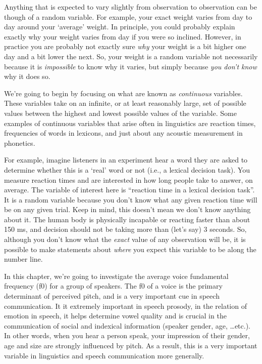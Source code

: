 \documentclass[
]{book}
\begin{document}
Anything that is expected to vary slightly from observation to observation can be though of a random variable. For example, your exact weight varies from day to day around your `average' weight. In principle, you could probably explain exactly why your weight varies from day if you were so inclined. However, in practice you are probably not exactly sure \emph{why} your weight is a bit higher one day and a bit lower the next. So, your weight is a random variable not necessarily because it is \emph{impossible} to know why it varies, but simply because \emph{you don't know} why it does so.

We're going to begin by focusing on what are known as \emph{continuous} variables. These variables take on an infinite, or at least reasonably large, set of possible values between the highest and lowest possible values of the variable. Some examples of continuous variables that arise often in linguistics are reaction times, frequencies of words in lexicons, and just about any acoustic measurement in phonetics.

For example, imagine listeners in an experiment hear a word they are asked to determine whether this is a `real' word or not (i.e., a lexical decision task). You measure reaction times and are interested in how long people take to answer, on average. The variable of interest here is ``reaction time in a lexical decision task''. It is a random variable because you don't know what any given reaction time will be on any given trial. Keep in mind, this doesn't mean we don't know anything about it. The human body is physically incapable or reacting faster than about 150 ms, and decision should not be taking more than (let's say) 3 seconds. So, although you don't know what the \emph{exact} value of any observation will be, it is possible to make statements about \emph{where} you expect this variable to be along the number line.

In this chapter, we're going to investigate the average voice fundamental frequency (f0) for a group of speakers. The f0 of a voice is the primary determinant of perceived pitch, and is a very important cue in speech communication. It it extremely important in speech prosody, in the relation of emotion in speech, it helps determine vowel quality and is crucial in the communication of social and indexical information (speaker gender, age, \ldots etc.). In other words, when you hear a person speak, your impression of their gender, age and size are strongly influenced by pitch. As a result, this is a very important variable in linguistics and speech communication more generally.
\end{document}
